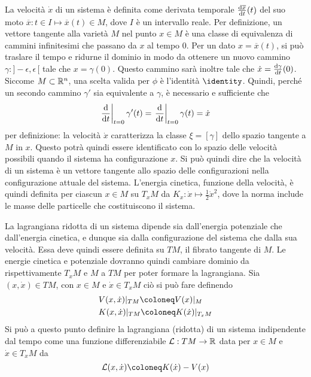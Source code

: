 La velocità $\dot{x}$ di un sistema è definita come derivata temporale $\dv{\overline{x}}{t}()(t)$ del suo moto $\overline{x}: t \in I \mapsto \overline{x}(t) \in M$, dove $I$ è un intervallo reale. Per definizione, un vettore tangente alla varietà $M$ nel punto $x \in M$ è una classe di equivalenza di cammini infinitesimi che passano da $x$ al tempo $0$. Per un dato $x =\overline{x}(t)$, si può traslare il tempo e ridurne il dominio in modo da ottenere un nuovo cammino $\gamma:]-\epsilon, \epsilon\,[$ tale che $x = \gamma(0)$. Questo cammino sarà inoltre tale che $\dot{x} = \dv{\gamma}{t}()(0)$. Siccome $M \subset \mathbb{R}^{n}$, una scelta valida per $\phi$ è l'identità $\identity$. Quindi, perché un secondo cammino $\gamma'$ sia equivalente a $\gamma$, è necessario e sufficiente che \begin{equation}
\eval{\dv{t}}_{t=0} \gamma'(t) = \eval{\dv{t}}_{t=0} \gamma(t) = \dot{x}
\end{equation}
per definizione: la velocità $\dot{x}$ caratterizza la classe $\xi = [\gamma]$ dello spazio tangente a $M$ in $x$. Questo potrà quindi essere identificato con lo spazio delle velocità possibili quando il sistema ha configurazione $x$. Si può quindi dire che la velocità di un sistema è un vettore tangente allo spazio delle configurazioni nella configurazione attuale del sistema. L'energia cinetica, funzione della velocità, è quindi definita per ciascun $x \in M$ su $T_x M$ da $K_x: \dot{x} \mapsto \frac{1}{2} \dot{x}^2$, dove la norma include le masse delle particelle che costituiscono il sistema.

La lagrangiana ridotta di un sistema dipende sia dall'energia potenziale che dall'energia cinetica, e dunque sia dalla configurazione del sistema che dalla sua velocità. Essa deve quindi essere definita su $TM$, il fibrato tangente di $M$. Le energie cinetica e potenziale dovranno quindi cambiare dominio da rispettivamente $T_x M$ e $M$ a $TM$ per poter formare la lagrangiana. Sia $(x,\dot{x}) \in TM$, con $x \in M$ e $\dot{x} \in T_x M$ ciò si può fare definendo \begin{equation}
\begin{aligned}
  &V(x,\dot{x})|_{TM} \defeq V(x)|_M \\
  &K(x, \dot{x})|_{TM} \defeq K(\dot{x})|_{T_x M}
\end{aligned}
\end{equation} 
Si può a questo punto definire la lagrangiana (ridotta) di un sistema indipendente dal tempo come una funzione differenziabile $\mathcal{L}:TM\to \mathbb{R}$ data per $x \in M$ e $\dot{x} \in T_x M$ da \begin{equation}
\mathcal{L}(x,\dot{x}) \defeq K(\dot{x}) - V(x)
\end{equation}

